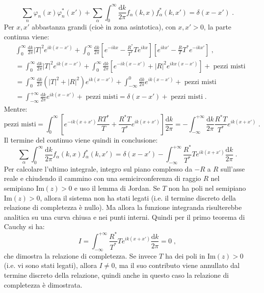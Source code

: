 \documentclass[12pt,a4paper]{report}
\theoremstyle{definition}
\numberwithin{equation}{section}
\newcommand{\diff}[1][]{\mathrm{d}#1}
\begin{document}
\begin{equation}
\sum_n \varphi_n(x)\varphi^*_n(x')+\sum_{\alpha}\int_0^{\infty} \frac{\diff{k}}{2\pi}f_{\alpha}(k,x)f^*_{\alpha}(k,x')=\delta(x-x')\;.
\end{equation}
Per $x,x'$ abbastanza grandi (cioè in zona asintotica), con $x,x'>0$, la parte continua viene:
\begin{align*}
&\int_0^{\infty}\frac{\diff{k}}{2\pi}|T|^2e^{ik(x-x')}+\int_0^{\infty}\frac{\diff{k}}{2\pi}\left[e^{-ikx}-\frac{R^*}{T^*}Te^{ikx}\right]\left[e^{ikx'}-\frac{R}{T}T^*e^{-ikx'}\right] \;, \\
&=\int_0^{\infty}\frac{\diff{k}}{2\pi}|T|^2e^{ik(x-x')}+\int_0^{\infty}\frac{\diff{k}}{2\pi}\left[e^{-ik(x-x')}+|R|^2e^{ikx(x-x')}\right]+\;\mbox{pezzi misti} \\
&=\int_0^{\infty}\frac{\diff{k}}{2\pi}(|T|^2+|R|^2)e^{ik(x-x')}+\int_{-\infty}^0\frac{\diff{k}}{2\pi}e^{ik(x-x')}+\;\mbox{pezzi misti} \\
&=\int_{-\infty}^{+\infty}\frac{\diff{k}}{2\pi}e^{ik(x-x')}+\;\mbox{pezzi misti}=\delta(x-x')+\;\mbox{pezzi misti}\;.
\end{align*}
Mentre:
$$
\mbox{pezzi misti} = \int_0^{\infty}\left[e^{-ik(x+x')}\frac{RT^*}{T}+\frac{R^*T}{T^*}e^{ik(x+x')}\right]\frac{\diff{k}}{2\pi}=-\int_{-\infty}^{+\infty}\frac{\diff{k}}{2\pi}\frac{R^* T}{T^*}e^{ik(x+x')}\;.
$$
Il termine del continuo viene quindi in conclusione:
\begin{equation}
\sum_{\alpha}\int_0^{\infty}\frac{\diff{k}}{2\pi}f_{\alpha}(k,x)f_{\alpha}^*(k,x')=\delta(x-x')-\int_{-\infty}^{+\infty} \frac{R^*}{T^*}Te^{ik(x+x')}\frac{\diff{k}}{2\pi}\;.
\end{equation}
Per calcolare l'ultimo integrale, integro sul piano complesso da $-R$ a $R$ sull'asse reale e chiudendo il cammino con una semicirconferenza di raggio $R$ nel semipiano $\mathrm{Im}(z)>0$ e uso il lemma di Jordan. Se $T$ non ha poli nel semipiano $\mathrm{Im}(z)>0$, allora il sistema non ha stati legati (i.e. il termine discreto della relazione di completezza è nullo). Ma allora la funzione integranda risulterebbe analitica su una curva chiusa e nei punti interni. Quindi per il primo teorema di Cauchy si ha:
$$
I=\int_{-\infty}^{+\infty} \frac{R^*}{T^*}Te^{ik(x+x')}\frac{\diff{k}}{2\pi}=0\;,
$$
che dimostra la relazione di completezza. Se invece $T$ ha dei poli in $\mathrm{Im}(z)>0$ (i.e. vi sono stati legati), allora $I\ne 0$, ma il suo contributo viene annullato dal termine discreto della relazione, quindi anche in questo caso la relazione di completezza è dimostrata. \\
\end{document}
